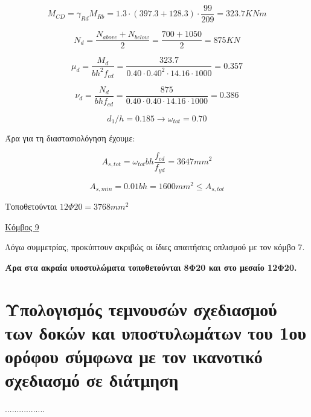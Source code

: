 \[
M_{CD}=\gamma_{Rd}M_{Rb} = 1.3\cdot(397.3+128.3)\cdot\dfrac{99}{209} =323.7 KNm 
\]

\[
N_d = \dfrac{N_{above}+N_{below}}{2}=\dfrac{700+1050}{2}=875 KN
\]

\[
\mu_d = \dfrac{M_d}{bh^2f_{cd}}=\dfrac{323.7}{0.40\cdot0.40^2\cdot14.16\cdot1000}=0.357
\]

\[
\nu_d = \dfrac{N_d}{bhf_{cd}}=\dfrac{875}{0.40\cdot0.40\cdot14.16\cdot1000}=0.386
\]

\[
d_1/h = 0.185 \rightarrow \omega_{tot}= 0.70
\]

\noindent
Άρα για τη διαστασιολόγηση έχουμε:

\[
A_{s,tot}=\omega_{tot} b h \dfrac{f_{cd}}{f_{yd}} = 3647 mm^2
\]

\[
A_{s,min}=0.01b h = 1600 mm^2 \leq A_{s,tot}
\]

\noindent
Τοποθετούνται $12\Phi20 = 3768 mm^2$

\bigskip

\noindent
\underline{Κόμβος 9}

\bigskip

\noindent
Λόγω συμμετρίας, προκύπτουν ακριβώς οι ίδιες απαιτήσεις οπλισμού με τον κόμβο 7.

\bigskip

\noindent\textbf{\textcolor{mygreen}{Άρα στα ακραία υποστυλώματα τοποθετούνται 8Φ20 και στο μεσαίο 12Φ20.}}

\section{Υπολογισμός τεμνουσών σχεδιασμού των δοκών και υποστυλωμάτων του 1ου ορόφου σύμφωνα με τον ικανοτικό σχεδιασμό σε διάτμηση}
.................
